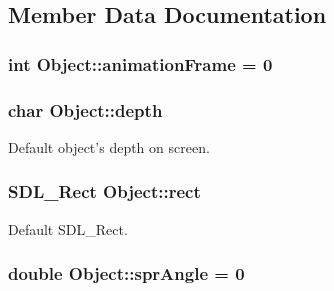 \subsection{Member Data Documentation}
\hypertarget{class_object_a671da7bcaade0763ea158d70137017a0}{
\subsubsection[{animation\-Frame}]{\setlength{\rightskip}{0pt plus 5cm}int Object\-::animation\-Frame = 0\hspace{0.3cm}{\ttfamily [protected]}}}\label{class_object_a671da7bcaade0763ea158d70137017a0}
\hypertarget{class_object_ac02426a63de0baa3b1761925793ea1cf}{
\subsubsection[{depth}]{\setlength{\rightskip}{0pt plus 5cm}char Object\-::depth\hspace{0.3cm}{\ttfamily [protected]}}}\label{class_object_ac02426a63de0baa3b1761925793ea1cf}


Default object's depth on screen. 

\hypertarget{class_object_ac2bf39eb033cf8c8fc9220d607842dbe}{
\subsubsection[{rect}]{\setlength{\rightskip}{0pt plus 5cm}S\-D\-L\-\_\-\-Rect Object\-::rect\hspace{0.3cm}{\ttfamily [protected]}}}\label{class_object_ac2bf39eb033cf8c8fc9220d607842dbe}


Default S\-D\-L\-\_\-\-Rect. 

\hypertarget{class_object_a5e5f645424be8ec1ce1cf9dd858e939a}{
\subsubsection[{spr\-Angle}]{\setlength{\rightskip}{0pt plus 5cm}double Object\-::spr\-Angle = 0\hspace{0.3cm}{\ttfamily [protected]}}}\label{class_object_a5e5f645424be8ec1ce1cf9dd858e939a}


